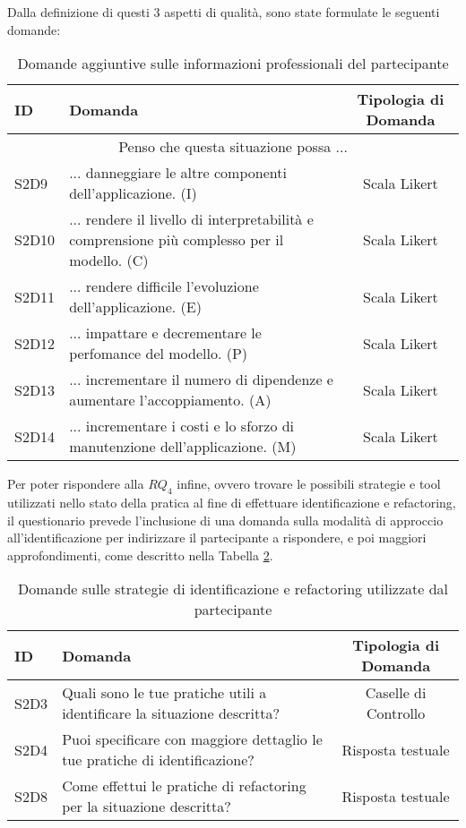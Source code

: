 Dalla definizione di questi 3 aspetti di qualità, sono state formulate le seguenti domande:

\begin{table}[h]
    \centering
    \begin{tabular}{|l|p{6cm}|c|}
        \hline
        
        \textbf{ID} & \textbf{Domanda} & \textbf{Tipologia di Domanda}\\
        \hline
        \hline
        \multicolumn{3}{|c|}{Penso che questa situazione possa ...}\\
        \hline
        S2D9 & ... danneggiare le altre componenti dell'applicazione. (I)  & Scala Likert\\
        \hline
        S2D10 & ... rendere il livello di interpretabilità e comprensione più complesso per il modello. (C)  & Scala Likert \\
        \hline
        S2D11 & ... rendere difficile l'evoluzione dell'applicazione. (E)& Scala Likert\\
        \hline
        S2D12 & ... impattare e decrementare le perfomance del modello. (P)& Scala Likert\\
        \hline
        S2D13 & ... incrementare il numero di dipendenze e aumentare l'accoppiamento. (A) & Scala Likert\\
        \hline
        \hline
        S2D14 & ... incrementare i costi e lo sforzo di manutenzione dell'applicazione. (M) & Scala Likert\\
        \hline
    \end{tabular}
    \caption{Domande aggiuntive sulle informazioni professionali del partecipante}
    \label{tab:q_freq_impact}
\end{table}


Per poter rispondere alla $RQ_4$ infine, ovvero trovare le possibili strategie e tool utilizzati nello stato della pratica al fine di effettuare identificazione e refactoring, il questionario prevede l'inclusione di una domanda sulla modalità di approccio all'identificazione per indirizzare il partecipante a rispondere, e poi maggiori approfondimenti, come descritto nella Tabella \ref{tab:q_identification}.

\begin{table}[h]
    \centering
    \begin{tabular}{|l|p{6.8cm}|c|}
        \hline
        \textbf{ID} & \textbf{Domanda} & \textbf{Tipologia di Domanda}\\
        \hline
        S2D3 & Quali sono le tue pratiche utili a identificare la situazione descritta?  & Caselle di Controllo\\
        \hline
        S2D4 & Puoi specificare con maggiore dettaglio le tue pratiche di identificazione?  & Risposta testuale\\
        \hline
        S2D8 & Come effettui le pratiche di refactoring per la situazione descritta? & Risposta testuale\\
        \hline
    \end{tabular}
    \caption{Domande sulle strategie di identificazione e refactoring utilizzate dal partecipante}
    \label{tab:q_identification}
\end{table}
